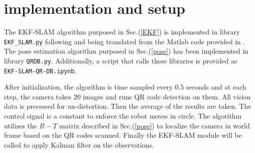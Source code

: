 \documentclass[12pt]{article}
\begin{document}
\section{implementation and setup}

The EKF-SLAM algorithm purposed in Sec.(\ref{EKF}) is implemented in library \texttt{EKF\_SLAM.py} following and being translated from the Matlab code provided in \cite{ekf}. The pose estimation algorithm purposed in Sec.(\ref{pose}) has been implemented in library \texttt{QRDB.py}.  Additionally, a script that calls these libraries is provided as \texttt{EKF-SLAM-QR-DB.ipynb}. 

After initialization, the algorithm is time sampled every $0.5$ seconds and at each step, the camera takes 20 images and runs QR code detection on them. All vision data is precessed for un-distortion. Then the average of the results are taken. The control signal is a constant to enforce the robot moves in circle. The algorithm utilizes the $R-T$ matrix described in Sec.(\ref{pose}) to localize the camera in world frame based on the QR codes scanned.  Finally the EKF-SLAM module will be called to apply Kalman filter on the observations.


\end{document}
